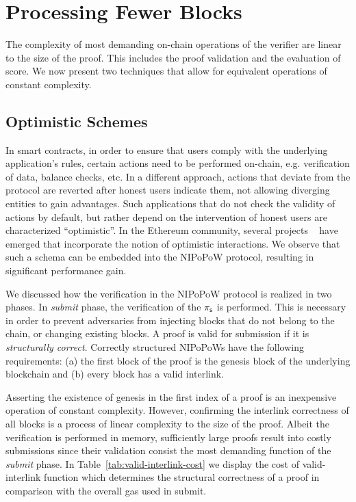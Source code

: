 \section{Processing Fewer Blocks}

The complexity of most demanding on-chain operations of the verifier are linear
to the size of the proof. This includes the proof validation and the evaluation
of score. We now present two techniques that allow for equivalent operations of
constant complexity.

\subsection{Optimistic Schemes} In smart contracts, in order to ensure that users
comply with the underlying application's rules, certain actions need to be
performed on-chain, e.g. verification of data, balance checks, etc. In a
different approach, actions that deviate from the protocol are reverted after
honest users indicate them, not allowing diverging entities to gain advantages.
Such applications that do not check the validity of actions by default, but
rather depend on the intervention of honest users are characterized
``optimistic''. In the Ethereum community, several projects ~\cite{piza,
plasma, rollups-1, rollups-2} have emerged that incorporate the notion of
optimistic interactions. We observe that such a schema can be embedded into the
NIPoPoW protocol, resulting in significant performance gain.

We discussed how the verification in the NIPoPoW protocol is realized in two
phases. In \emph{submit} phase, the verification of the $\mathsf{\pi_{s}}$ is performed.
This is necessary in order to prevent adversaries from injecting blocks that do
not belong to the chain, or changing existing blocks. A proof is valid for
submission if it is \emph{structurally correct}. Correctly structured NIPoPoWs
have the following requirements: (a) the first block of the proof is the
genesis block of the underlying blockchain and (b) every block has a valid
interlink.

Asserting the existence of genesis in the first index of a proof is an
inexpensive operation of constant complexity. However, confirming the interlink
correctness of all blocks is a process of linear complexity to the size of the
proof. Albeit the verification is performed in memory, sufficiently large
proofs result into costly submissions since their validation consist the most
demanding function of the \emph{submit} phase. In
Table~\ref{tab:valid-interlink-cost} we display the cost of
\textsf{valid-interlink} function which determines the structural correctness
of a proof in comparison with the overall gas used in \textsf{submit}.

